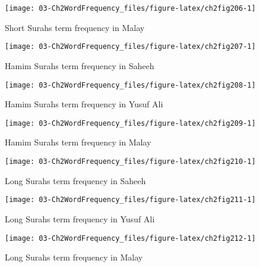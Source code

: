 \documentclass[
]{article}
\begin{document}
\begin{figure}

{\centering \texttt{[image: 03-Ch2WordFrequency\_files/figure-latex/ch2fig206-1]} 

}

\caption{Short Surahs term frequency in Malay}\label{fig:ch2fig206}
\end{figure}

\begin{figure}

{\centering \texttt{[image: 03-Ch2WordFrequency\_files/figure-latex/ch2fig207-1]} 

}

\caption{Hamim Surahs term frequency in Saheeh}\label{fig:ch2fig207}
\end{figure}

\begin{figure}

{\centering \texttt{[image: 03-Ch2WordFrequency\_files/figure-latex/ch2fig208-1]} 

}

\caption{Hamim Surahs term frequency in Yusuf Ali}\label{fig:ch2fig208}
\end{figure}

\begin{figure}

{\centering \texttt{[image: 03-Ch2WordFrequency\_files/figure-latex/ch2fig209-1]} 

}

\caption{Hamim Surahs term frequency in Malay}\label{fig:ch2fig209}
\end{figure}

\begin{figure}

{\centering \texttt{[image: 03-Ch2WordFrequency\_files/figure-latex/ch2fig210-1]} 

}

\caption{Long Surahs term frequency in Saheeh}\label{fig:ch2fig210}
\end{figure}

\begin{figure}

{\centering \texttt{[image: 03-Ch2WordFrequency\_files/figure-latex/ch2fig211-1]} 

}

\caption{Long Surahs term frequency in Yusuf Ali}\label{fig:ch2fig211}
\end{figure}

\begin{figure}

{\centering \texttt{[image: 03-Ch2WordFrequency\_files/figure-latex/ch2fig212-1]} 

}

\caption{Long Surahs term frequency in Malay}\label{fig:ch2fig212}
\end{figure}
\end{document}
